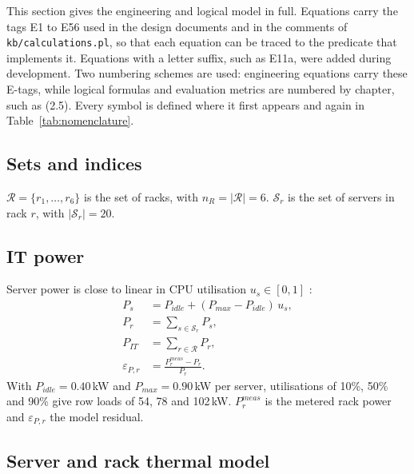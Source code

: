 This section gives the engineering and logical model in full. Equations carry the tags E1 to E56 used in the design documents and in the comments of \texttt{kb/calculations.pl}, so that each equation can be traced to the predicate that implements it. Equations with a letter suffix, such as E11a, were added during development. Two numbering schemes are used: engineering equations carry these E-tags, while logical formulas and evaluation metrics are numbered by chapter, such as (2.5). Every symbol is defined where it first appears and again in Table~\ref{tab:nomenclature}.

\subsection{Sets and indices}

$\mathcal{R} = \{r_1, \dots, r_6\}$ is the set of racks, with $n_R = \lvert\mathcal{R}\rvert = 6$. $\mathcal{S}_r$ is the set of servers in rack $r$, with $\lvert\mathcal{S}_r\rvert = 20$.

\subsection{IT power}

Server power is close to linear in CPU utilisation $u_s \in [0,1]$ \parencite{fan2007}:
\begin{align}
  P_s &= P_{idle} + (P_{max} - P_{idle})\, u_s , \tag{E1}\label{eq:e1}\\
  P_r &= \textstyle\sum_{s \in \mathcal{S}_r} P_s , \tag{E2}\\
  P_{IT} &= \textstyle\sum_{r \in \mathcal{R}} P_r , \tag{E3}\\
  \varepsilon_{P,r} &= \frac{P_r^{meas} - P_r}{P_r} . \tag{E4}
\end{align}
With $P_{idle} = 0.40$\,kW and $P_{max} = 0.90$\,kW per server, utilisations of 10\%, 50\% and 90\% give row loads of 54, 78 and 102\,kW. $P_r^{meas}$ is the metered rack power and $\varepsilon_{P,r}$ the model residual.

\subsection{Server and rack thermal model}

